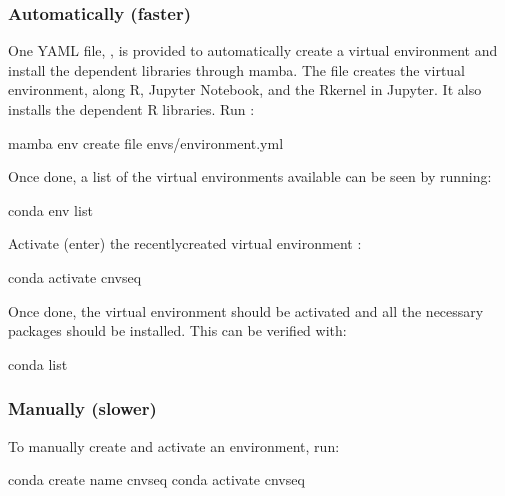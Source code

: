 \documentclass[letterpaper,10pt,english]{sphinxhowto}
\begin{document}
\subsubsection{Automatically (faster)}
\label{\detokenize{index:automatically-faster}}
\sphinxAtStartPar
One YAML file, , is provided to automatically create a virtual environment and install the dependent libraries through mamba. The file creates the  virtual environment, along R, Jupyter Notebook, and the R\sphinxhyphen{}kernel in Jupyter. It also installs the dependent R libraries. Run :

\begin{sphinxVerbatim}[commandchars=\\\{\}]
\PYGZdl{} mamba env create \PYGZhy{}\PYGZhy{}file envs/environment.yml
\end{sphinxVerbatim}

\sphinxAtStartPar
Once done, a list of the virtual environments available can be seen by running:

\begin{sphinxVerbatim}[commandchars=\\\{\}]
\PYGZdl{} conda env list
\end{sphinxVerbatim}

\sphinxAtStartPar
Activate (enter) the recently\sphinxhyphen{}created virtual environment :

\begin{sphinxVerbatim}[commandchars=\\\{\}]
\PYGZdl{} conda activate cnvseq
\end{sphinxVerbatim}

\sphinxAtStartPar
Once done, the virtual environment should be activated and all the necessary packages should be installed. This can be verified with:

\begin{sphinxVerbatim}[commandchars=\\\{\}]
\PYGZdl{} conda list
\end{sphinxVerbatim}


\subsubsection{Manually (slower)}
\label{\detokenize{index:manually-slower}}
\sphinxAtStartPar
To manually create and activate an environment, run:

\begin{sphinxVerbatim}[commandchars=\\\{\}]
\PYGZdl{} conda create \PYGZhy{}\PYGZhy{}name cnvseq
\PYGZdl{} conda activate cnvseq
\end{sphinxVerbatim}
\end{document}
